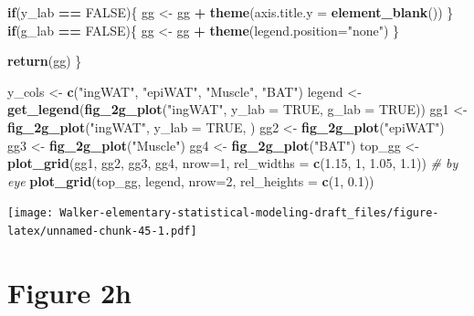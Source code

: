 \documentclass[]{book}
\newenvironment{Shaded}{\begin{snugshade}}{\end{snugshade}}
\newcommand{\CommentTok}[1]{\textcolor[rgb]{0.56,0.35,0.01}{\textit{#1}}}
\newcommand{\ControlFlowTok}[1]{\textcolor[rgb]{0.13,0.29,0.53}{\textbf{#1}}}
\newcommand{\DataTypeTok}[1]{\textcolor[rgb]{0.13,0.29,0.53}{#1}}
\newcommand{\DecValTok}[1]{\textcolor[rgb]{0.00,0.00,0.81}{#1}}
\newcommand{\FloatTok}[1]{\textcolor[rgb]{0.00,0.00,0.81}{#1}}
\newcommand{\KeywordTok}[1]{\textcolor[rgb]{0.13,0.29,0.53}{\textbf{#1}}}
\newcommand{\NormalTok}[1]{#1}
\newcommand{\OperatorTok}[1]{\textcolor[rgb]{0.81,0.36,0.00}{\textbf{#1}}}
\newcommand{\OtherTok}[1]{\textcolor[rgb]{0.56,0.35,0.01}{#1}}
\newcommand{\StringTok}[1]{\textcolor[rgb]{0.31,0.60,0.02}{#1}}
\begin{document}
\begin{Shaded}
\begin{Highlighting}[]
  \ControlFlowTok{if}\NormalTok{(y_lab }\OperatorTok{==}\StringTok{ }\OtherTok{FALSE}\NormalTok{)\{}
\NormalTok{    gg <-}\StringTok{ }\NormalTok{gg }\OperatorTok{+}\StringTok{ }\KeywordTok{theme}\NormalTok{(}\DataTypeTok{axis.title.y =} \KeywordTok{element_blank}\NormalTok{())}
\NormalTok{  \}}
  \ControlFlowTok{if}\NormalTok{(g_lab }\OperatorTok{==}\StringTok{ }\OtherTok{FALSE}\NormalTok{)\{}
\NormalTok{    gg <-}\StringTok{ }\NormalTok{gg }\OperatorTok{+}\StringTok{ }\KeywordTok{theme}\NormalTok{(}\DataTypeTok{legend.position=}\StringTok{"none"}\NormalTok{)}
\NormalTok{  \}}
  
  \KeywordTok{return}\NormalTok{(gg)}
\NormalTok{\}}

\NormalTok{y_cols <-}\StringTok{ }\KeywordTok{c}\NormalTok{(}\StringTok{"ingWAT"}\NormalTok{, }\StringTok{"epiWAT"}\NormalTok{, }\StringTok{"Muscle"}\NormalTok{, }\StringTok{"BAT"}\NormalTok{)}
\NormalTok{legend <-}\StringTok{ }\KeywordTok{get_legend}\NormalTok{(}\KeywordTok{fig_2g_plot}\NormalTok{(}\StringTok{"ingWAT"}\NormalTok{, }\DataTypeTok{y_lab =} \OtherTok{TRUE}\NormalTok{, }\DataTypeTok{g_lab =} \OtherTok{TRUE}\NormalTok{))}
\NormalTok{gg1 <-}\StringTok{ }\KeywordTok{fig_2g_plot}\NormalTok{(}\StringTok{"ingWAT"}\NormalTok{, }\DataTypeTok{y_lab =} \OtherTok{TRUE}\NormalTok{, )}
\NormalTok{gg2 <-}\StringTok{ }\KeywordTok{fig_2g_plot}\NormalTok{(}\StringTok{"epiWAT"}\NormalTok{)}
\NormalTok{gg3 <-}\StringTok{ }\KeywordTok{fig_2g_plot}\NormalTok{(}\StringTok{"Muscle"}\NormalTok{)}
\NormalTok{gg4 <-}\StringTok{ }\KeywordTok{fig_2g_plot}\NormalTok{(}\StringTok{"BAT"}\NormalTok{)}
\NormalTok{top_gg <-}\StringTok{ }\KeywordTok{plot_grid}\NormalTok{(gg1, gg2, gg3, gg4,}
                       \DataTypeTok{nrow=}\DecValTok{1}\NormalTok{,}
                       \DataTypeTok{rel_widths =} \KeywordTok{c}\NormalTok{(}\FloatTok{1.15}\NormalTok{, }\DecValTok{1}\NormalTok{, }\FloatTok{1.05}\NormalTok{, }\FloatTok{1.1}\NormalTok{)) }\CommentTok{# by eye}
\KeywordTok{plot_grid}\NormalTok{(top_gg, legend,}
          \DataTypeTok{nrow=}\DecValTok{2}\NormalTok{,}
          \DataTypeTok{rel_heights =} \KeywordTok{c}\NormalTok{(}\DecValTok{1}\NormalTok{, }\FloatTok{0.1}\NormalTok{))}
\end{Highlighting}
\end{Shaded}

\texttt{[image: Walker-elementary-statistical-modeling-draft\_files/figure-latex/unnamed-chunk-45-1.pdf]}

\hypertarget{figure-2h}{%
\section{Figure 2h}\label{figure-2h}}
\end{document}
